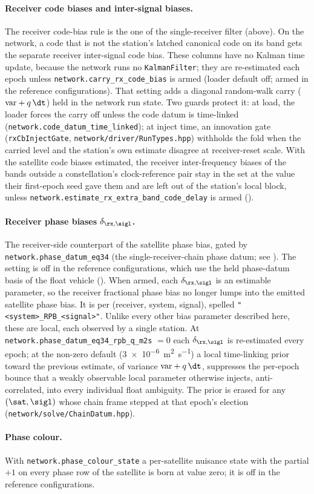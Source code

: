 \paragraph{Receiver code biases and inter-signal biases.}
The receiver code-bias rule is the one of the single-receiver filter
(above).  On the network, a code that is not the station's latched canonical
code on its band gets the separate receiver inter-signal code bias.  These
columns have no Kalman time update, because the network runs no
\texttt{KalmanFilter}; they are re-estimated each epoch unless
\texttt{network.carry\_rx\_code\_bias} is armed (loader default off; armed in
the reference configurations).  That setting adds a diagonal random-walk
carry ($\mathrm{var} + q\,\dt$) held in the network run state.  Two guards
protect it: at load, the loader forces the carry off unless the code datum is
time-linked (\texttt{network.code\_datum\_time\_linked}); at inject time, an
innovation gate (\texttt{rxCbInjectGate}, \texttt{network/driver/RunTypes.hpp})
withholds the fold when the carried level and the station's own estimate
disagree at receiver-reset scale.  With the satellite code biases estimated,
the receiver inter-frequency biases of the bands outside a constellation's
clock-reference pair stay in the set at the value their first-epoch seed gave
them and are left out of the station's local block, unless
\texttt{network.estimate\_rx\_extra\_band\_code\_delay} is armed
().

\paragraph{Receiver phase biases $\delta_{\rx,\sigl}$.}
The receiver-side counterpart of the satellite phase bias, gated by
\texttt{network.phase\_datum\_eq34} (the single-receiver-chain phase datum;
see ).  The setting is off in the
reference configurations, which use the held phase-datum basis of the float
vehicle ().  When armed,
each $\delta_{\rx,\sigl}$ is an estimable parameter, so the receiver
fractional phase bias no longer lumps into the emitted satellite phase bias.
It is per (receiver, system, signal), spelled \texttt{"<system>\_RPB\_<signal>"}.
Unlike every other bias parameter described here, these are local, each
observed by a single station.  At \texttt{network.phase\_datum\_eq34\_rpb\_q\_m2s}
$=0$ each $\delta_{\rx,\sigl}$ is re-estimated every epoch; at the non-zero
default (\SI{3e-6}{\metre\squared\per\second}) a local time-linking prior
toward the previous estimate, of variance $\mathrm{var} + q\,\dt$, suppresses
the per-epoch bounce that a weakly observable local parameter otherwise injects,
anti-correlated, into every individual float ambiguity.  The prior is erased
for any $(\sat,\sigl)$ whose chain frame stepped at that epoch's election
(\texttt{network/solve/ChainDatum.hpp}).

\paragraph{Phase colour.}
With \texttt{network.phase\_colour\_state} a per-satellite nuisance state with
the partial $+1$ on every phase row of the satellite is born at value zero;
it is off in the reference configurations.
